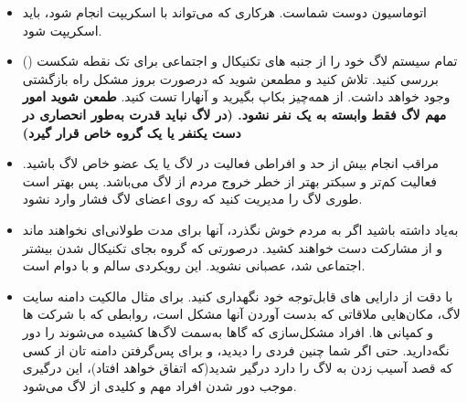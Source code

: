 \begin{itemize}

\item
اتوماسیون دوست شماست. هرکاری که می‌تواند با اسکریپت انجام شود،
باید اسکریپت شود.

\item
تمام سیستم لاگ خود را از جنبه های تکنیکال و اجتماعی برای تک نقطه شکست
()
بررسی کنید. تلاش کنید و مطمعن شوید که درصورت بروز مشکل راه بازگشتی وجود خواهد داشت.
از همه‌چیز بکاپ بگیرید و آنهارا تست کنید.
{\bfseries
طمعن شوید امور مهم لاگ فقط وابسته به یک نفر نشود.
(در لاگ نباید قدرت به‌طور انحصاری در دست یکنفر یا یک گروه خاص قرار گیرد)
}

\item
مراقب انجام بیش از حد و افراطی فعالیت در لاگ یا یک عضو خاص لاگ باشید.
فعالیت کم‌تر و سبکتر بهتر از خطر خروج مردم از لاگ می‌باشد.
پس بهتر است طوری لاگ را مدیریت کنید که روی اعضای لاگ فشار وارد نشود.

\item
به‌یاد داشته باشید اگر به مردم خوش نگذرد، آنها برای مدت طولانی‌ای
نخواهند ماند و از مشارکت دست خواهند کشید. درصورتی که گروه بجای تکنیکال شدن
بیشتر اجتماعی شد، عصبانی نشوید. این رویکردی سالم و با دوام است.

\item
با دقت از دارایی های قابل‌توجه خود نگهداری کنید. برای مثال مالکیت دامنه سایت لاگ،
مکان‌هایی ملاقاتی که بدست آوردن آنها مشکل است، روابطی که با شرکت ها و کمپانی ها.
افراد مشکل‌سازی که گاها به‌سمت لاگ‌ها کشیده می‌شوند را دور نگه‌دارید.
حتی اگر شما چنین فردی را دیدید، و برای پس‌گرفتن دامنه تان از کسی که قصد آسیب زدن به
لاگ را دارد درگیر شدید(که اتفاق خواهد افتاد)،
این درگیری موجب دور شدن افراد مهم و کلیدی از لاگ می‌شود.
\end{itemize}

